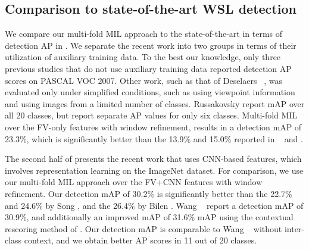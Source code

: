\documentclass[10pt,journal,cspaper,final,twocolumn,compsoc]{./IEEEtran}
\begin{document}
\subsection{Comparison to state-of-the-art WSL detection}\label{sec:CompSota}

We compare  our multi-fold MIL approach
to the state-of-the-art in terms of detection AP in .  We separate
the recent work into two groups in terms of their
utilization of auxiliary training data.  
To the best our knowledge, only three previous studies  that do not
use auxiliary training data reported 
detection AP scores on PASCAL VOC 2007. Other work, such as \eg that of Deselaers \etal~\cite{deselaers12ijcv}, was evaluated only under
simplified conditions, such as using viewpoint information
and using images from a limited number of classes.
Russakovsky \etal\cite{russakovsky12eccv} report mAP over
all 20 classes, but report separate AP values for only six
classes.  Multi-fold MIL over the FV-only features with window refinement, results
in a detection mAP of 23.3\%, which is significantly
better than the 13.9\% and 15.0\% reported in ~\cite{siva11iccv} and \cite{russakovsky12eccv}. 


The second half of  presents the recent
work that uses CNN-based features, which involves
representation learning on the ImageNet dataset. For
comparison, we use our multi-fold MIL approach over the
FV+CNN features with window refinement.  Our detection mAP
of 30.2\% is significantly better than the 22.7\%  and 24.6\% by Song \etal\cite{song14icml,song14nips}, and the 26.4\% by Bilen \etal\cite{bilen14bmvc}.  Wang \etal~\cite{wang14eccv} report a
detection mAP of 30.9\%, and additionally an improved mAP
of 31.6\% mAP using the contextual rescoring method of
\cite{felzenszalb10pami}.  Our detection mAP is comparable
to Wang \etal~\cite{wang14eccv} without inter-class
context, and we obtain better AP scores in 11 out of 20
classes. 
\end{document}
